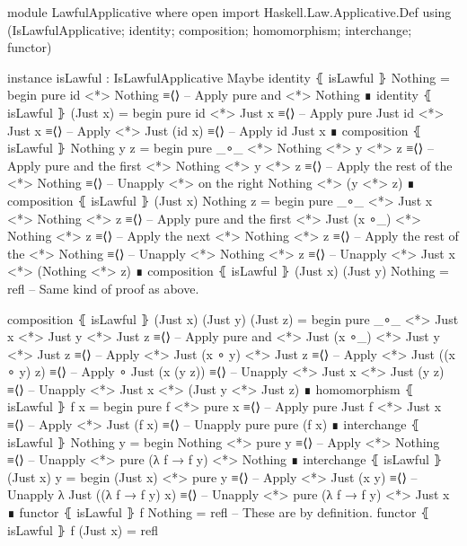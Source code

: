 \documentclass{article}
\begin{document}
\begin{code}
module LawfulApplicative where
  open import Haskell.Law.Applicative.Def
    using (IsLawfulApplicative; identity; composition;
      homomorphism; interchange; functor)

  instance
    isLawful : IsLawfulApplicative Maybe
    identity ⦃ isLawful ⦄ Nothing =
      begin
        pure id <*> Nothing
      ≡⟨⟩ -- Apply pure and <*>
        Nothing
      ∎
    identity ⦃ isLawful ⦄ (Just x) =
      begin
        pure id <*> Just x
      ≡⟨⟩ -- Apply pure
        Just id <*> Just x
      ≡⟨⟩ -- Apply <*>
        Just (id x)
      ≡⟨⟩ -- Apply id
        Just x
      ∎
    composition ⦃ isLawful ⦄ Nothing y z =
      begin
        pure _∘_ <*> Nothing <*> y <*> z
      ≡⟨⟩ -- Apply pure and the first <*>
        Nothing <*> y <*> z
      ≡⟨⟩ -- Apply the rest of the <*>
        Nothing
      ≡⟨⟩ -- Unapply <*> on the right
        Nothing <*> (y <*> z)
      ∎
    composition ⦃ isLawful ⦄ (Just x) Nothing z =
      begin
        pure _∘_ <*> Just x <*> Nothing <*> z
      ≡⟨⟩ -- Apply pure and the first <*>
        Just (x ∘_) <*> Nothing <*> z
      ≡⟨⟩ -- Apply the next <*>
        Nothing <*> z
      ≡⟨⟩ -- Apply the rest of the <*>
        Nothing
      ≡⟨⟩ -- Unapply <*>
        Nothing <*> z
      ≡⟨⟩ -- Unapply <*>
        Just x <*> (Nothing <*> z)
      ∎
    composition ⦃ isLawful ⦄ (Just x) (Just y) Nothing =
      refl -- Same kind of proof as above.
\end{code}

\begin{code}
    composition ⦃ isLawful ⦄ (Just x) (Just y) (Just z) =
      begin
        pure _∘_ <*> Just x <*> Just y <*> Just z
      ≡⟨⟩ -- Apply pure and <*>
        Just (x ∘_) <*> Just y <*> Just z
      ≡⟨⟩ -- Apply <*>
        Just (x ∘ y) <*> Just z
      ≡⟨⟩ -- Apply <*>
        Just ((x ∘ y) z)
      ≡⟨⟩ -- Apply ∘
        Just (x (y z))
      ≡⟨⟩ -- Unapply <*>
        Just x <*> Just (y z)
      ≡⟨⟩ -- Unapply <*>
        Just x <*> (Just y <*> Just z)
      ∎
    homomorphism ⦃ isLawful ⦄ f x =
      begin
        pure f <*> pure x
      ≡⟨⟩ -- Apply pure
        Just f <*> Just x
      ≡⟨⟩ -- Apply <*>
        Just (f x)
      ≡⟨⟩ -- Unapply pure
        pure (f x)
      ∎
    interchange ⦃ isLawful ⦄ Nothing y =
      begin
        Nothing <*> pure y
      ≡⟨⟩ -- Apply <*>
        Nothing
      ≡⟨⟩ -- Unapply <*>
        pure (λ f → f y) <*> Nothing
      ∎
    interchange ⦃ isLawful ⦄ (Just x) y =
      begin
        (Just x) <*> pure y
      ≡⟨⟩ -- Apply <*>
        Just (x y)
      ≡⟨⟩ -- Unapply λ
        Just ((λ f → f y) x)
      ≡⟨⟩ -- Unapply <*>
        pure (λ f → f y) <*> Just x
      ∎
    functor ⦃ isLawful ⦄ f Nothing = refl -- These are by definition.
    functor ⦃ isLawful ⦄ f (Just x) = refl
\end{code}
\end{document}
